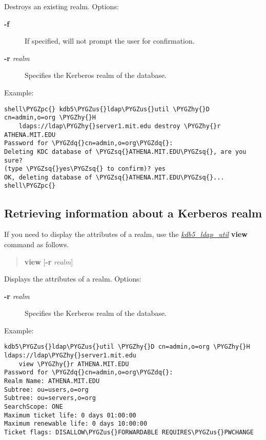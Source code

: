 \documentclass[letterpaper,10pt,english]{sphinxmanual}
\def\PYGZus{\char`\_}
\def\PYGZpc{\char`\%}
\def\PYGZhy{\char`\-}
\def\PYGZsq{\char`\'}
\def\PYGZdq{\char`\"}
\begin{document}
Destroys an existing realm. Options:
\begin{description}
\item[{\textbf{-f}}] \leavevmode
If specified, will not prompt the user for confirmation.

\item[{\textbf{-r} \emph{realm}}] \leavevmode
Specifies the Kerberos realm of the database.

\end{description}

Example:

\begin{Verbatim}[commandchars=\\\{\}]
shell\PYGZpc{} kdb5\PYGZus{}ldap\PYGZus{}util \PYGZhy{}D cn=admin,o=org \PYGZhy{}H
    ldaps://ldap\PYGZhy{}server1.mit.edu destroy \PYGZhy{}r ATHENA.MIT.EDU
Password for \PYGZdq{}cn=admin,o=org\PYGZdq{}:
Deleting KDC database of \PYGZsq{}ATHENA.MIT.EDU\PYGZsq{}, are you sure?
(type \PYGZsq{}yes\PYGZsq{} to confirm)? yes
OK, deleting database of \PYGZsq{}ATHENA.MIT.EDU\PYGZsq{}...
shell\PYGZpc{}
\end{Verbatim}


\subsection{Retrieving information about a Kerberos realm}
\label{admin/database:retrieving-information-about-a-kerberos-realm}
If you need to display the attributes of a realm, use the
{\hyperref[admin/admin_commands/kdb5_ldap_util:kdb5-ldap-util-8]{\emph{kdb5\_ldap\_util}}} \textbf{view} command as follows.
\begin{quote}

\textbf{view} {[}\textbf{-r} \emph{realm}{]}
\end{quote}

Displays the attributes of a realm.  Options:
\begin{description}
\item[{\textbf{-r} \emph{realm}}] \leavevmode
Specifies the Kerberos realm of the database.

\end{description}

Example:

\begin{Verbatim}[commandchars=\\\{\}]
kdb5\PYGZus{}ldap\PYGZus{}util \PYGZhy{}D cn=admin,o=org \PYGZhy{}H ldaps://ldap\PYGZhy{}server1.mit.edu
    view \PYGZhy{}r ATHENA.MIT.EDU
Password for \PYGZdq{}cn=admin,o=org\PYGZdq{}:
Realm Name: ATHENA.MIT.EDU
Subtree: ou=users,o=org
Subtree: ou=servers,o=org
SearchScope: ONE
Maximum ticket life: 0 days 01:00:00
Maximum renewable life: 0 days 10:00:00
Ticket flags: DISALLOW\PYGZus{}FORWARDABLE REQUIRES\PYGZus{}PWCHANGE
\end{Verbatim}
\end{document}
